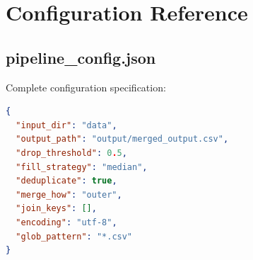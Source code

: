 \documentclass[12pt,a4paper]{report}
\begin{document}
\chapter{Configuration Reference}

\section{pipeline\_config.json}

Complete configuration specification:

\begin{lstlisting}[language=json]
{
  "input_dir": "data",
  "output_path": "output/merged_output.csv",
  "drop_threshold": 0.5,
  "fill_strategy": "median",
  "deduplicate": true,
  "merge_how": "outer",
  "join_keys": [],
  "encoding": "utf-8",
  "glob_pattern": "*.csv"
}
\end{lstlisting}
\end{document}
